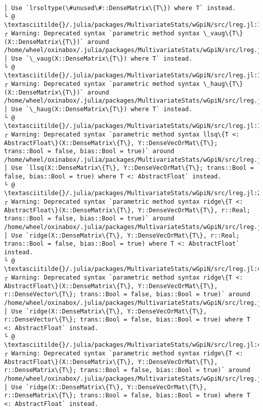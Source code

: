 \documentclass[11pt]{article}
\begin{document}
\begin{Verbatim}[commandchars=\\\{\}]
│ Use `lrsoltype(\#unused\#::DenseMatrix\{T\}) where T` instead.
└ @ \textasciitilde{}/.julia/packages/MultivariateStats/wGpiN/src/lreg.jl:14
┌ Warning: Deprecated syntax `parametric method syntax \_vaug\{T\}(X::DenseMatrix\{T\})` around /home/wheel/oxinabox/.julia/packages/MultivariateStats/wGpiN/src/lreg.jl:16.
│ Use `\_vaug(X::DenseMatrix\{T\}) where T` instead.
└ @ \textasciitilde{}/.julia/packages/MultivariateStats/wGpiN/src/lreg.jl:16
┌ Warning: Deprecated syntax `parametric method syntax \_haug\{T\}(X::DenseMatrix\{T\})` around /home/wheel/oxinabox/.julia/packages/MultivariateStats/wGpiN/src/lreg.jl:17.
│ Use `\_haug(X::DenseMatrix\{T\}) where T` instead.
└ @ \textasciitilde{}/.julia/packages/MultivariateStats/wGpiN/src/lreg.jl:17
┌ Warning: Deprecated syntax `parametric method syntax llsq\{T <: AbstractFloat\}(X::DenseMatrix\{T\}, Y::DenseVecOrMat\{T\}; trans::Bool = false, bias::Bool = true)` around /home/wheel/oxinabox/.julia/packages/MultivariateStats/wGpiN/src/lreg.jl:24.
│ Use `llsq(X::DenseMatrix\{T\}, Y::DenseVecOrMat\{T\}; trans::Bool = false, bias::Bool = true) where T <: AbstractFloat` instead.
└ @ \textasciitilde{}/.julia/packages/MultivariateStats/wGpiN/src/lreg.jl:24
┌ Warning: Deprecated syntax `parametric method syntax ridge\{T <: AbstractFloat\}(X::DenseMatrix\{T\}, Y::DenseVecOrMat\{T\}, r::Real; trans::Bool = false, bias::Bool = true)` around /home/wheel/oxinabox/.julia/packages/MultivariateStats/wGpiN/src/lreg.jl:40.
│ Use `ridge(X::DenseMatrix\{T\}, Y::DenseVecOrMat\{T\}, r::Real; trans::Bool = false, bias::Bool = true) where T <: AbstractFloat` instead.
└ @ \textasciitilde{}/.julia/packages/MultivariateStats/wGpiN/src/lreg.jl:40
┌ Warning: Deprecated syntax `parametric method syntax ridge\{T <: AbstractFloat\}(X::DenseMatrix\{T\}, Y::DenseVecOrMat\{T\}, r::DenseVector\{T\}; trans::Bool = false, bias::Bool = true)` around /home/wheel/oxinabox/.julia/packages/MultivariateStats/wGpiN/src/lreg.jl:47.
│ Use `ridge(X::DenseMatrix\{T\}, Y::DenseVecOrMat\{T\}, r::DenseVector\{T\}; trans::Bool = false, bias::Bool = true) where T <: AbstractFloat` instead.
└ @ \textasciitilde{}/.julia/packages/MultivariateStats/wGpiN/src/lreg.jl:47
┌ Warning: Deprecated syntax `parametric method syntax ridge\{T <: AbstractFloat\}(X::DenseMatrix\{T\}, Y::DenseVecOrMat\{T\}, r::DenseMatrix\{T\}; trans::Bool = false, bias::Bool = true)` around /home/wheel/oxinabox/.julia/packages/MultivariateStats/wGpiN/src/lreg.jl:54.
│ Use `ridge(X::DenseMatrix\{T\}, Y::DenseVecOrMat\{T\}, r::DenseMatrix\{T\}; trans::Bool = false, bias::Bool = true) where T <: AbstractFloat` instead.

\end{Verbatim}
\end{document}

